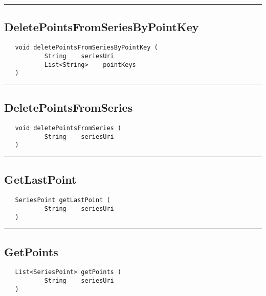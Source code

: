 \rule{15cm}{2pt}
\subsection{DeletePointsFromSeriesByPointKey}
\label{Api:DeletePointsFromSeriesByPointKey}
\begin{verbatim}
   void deletePointsFromSeriesByPointKey (
           String    seriesUri
           List<String>    pointKeys
   )
\end{verbatim}



\rule{15cm}{2pt}
\subsection{DeletePointsFromSeries}
\label{Api:DeletePointsFromSeries}
\begin{verbatim}
   void deletePointsFromSeries (
           String    seriesUri
   )
\end{verbatim}



\rule{15cm}{2pt}
\subsection{GetLastPoint}
\label{Api:GetLastPoint}
\begin{verbatim}
   SeriesPoint getLastPoint (
           String    seriesUri
   )
\end{verbatim}



\rule{15cm}{2pt}
\subsection{GetPoints}
\label{Api:GetPoints}
\begin{verbatim}
   List<SeriesPoint> getPoints (
           String    seriesUri
   )
\end{verbatim}



